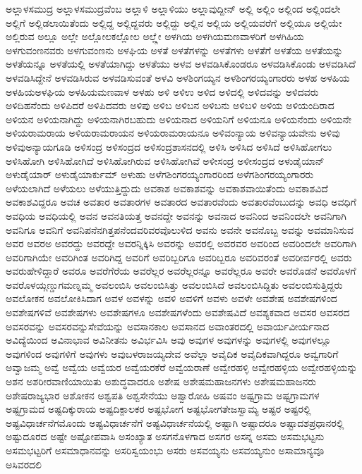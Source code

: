 {ಅಲ್ಲಾಳಸಮುದ್ರ
ಅಲ್ಲಾಳಸಮುದ್ರವೆಂಬ
ಅಲ್ಲಾಳಿ
ಅಲ್ಲಾಳಿಯು
ಅಲ್ಲಾವುದ್ದೀನ್
ಅಲ್ಲಿ
ಅಲ್ಲಿಂ
ಅಲ್ಲಿಂದ
ಅಲ್ಲಿಂದಲೇ
ಅಲ್ಲಿಗೆ
ಅಲ್ಲಿಡಲಾಯಿತೆಂದು
ಅಲ್ಲಿದ್ದ
ಅಲ್ಲಿದ್ದವರು
ಅಲ್ಲಿದ್ದು
ಅಲ್ಲಿನ
ಅಲ್ಲಿಯ
ಅಲ್ಲಿಯವರೆಗೆ
ಅಲ್ಲಿಯೂ
ಅಲ್ಲಿಯೇ
ಅಲ್ಲಿರುವ
ಅಲ್ಲೂ
ಅಲ್ಲೇ
ಅಲ್ಲೋಲಕಲ್ಲೋಲ
ಅಲ್ಲ್ಲೇ
ಅಳಗಿಯ
ಅಳಗಿಯಮಣವಾಳರಿಗೆ
ಅಳಗಿಹಿಯ
ಅಳಗುವಂಣನವರು
ಅಳಗುವಂಣನು
ಅಳಘಿಯ
ಅಳತೆ
ಅಳತೆಗಳನ್ನು
ಅಳತೆಗಳು
ಅಳತೆಗೆ
ಅಳತೆಯ
ಅಳತೆಯನ್ನು
ಅಳತೆಯನ್ನೂ
ಅಳತೆಯಲ್ಲಿ
ಅಳತೆಯಾಗಿದ್ದು
ಅಳತೆಯು
ಅಳವ
ಅಳವಡಿಸಿಕೊಂಡರೂ
ಅಳವಡಿಸಿಕೊಂಡು
ಅಳವಡಿಸಿದೆ
ಅಳವಡಿಸಿದ್ದೇನೆ
ಅಳವಡಿಸಿರುವ
ಅಳವಡಿಸುವಂತೆ
ಅಳವಿ
ಅಳಶಿಂಗಯ್ಯನ
ಅಳಶಿಂಗರಯ್ಯಂಗಾರರು
ಅಳಹ
ಅಳಹಿಯ
ಅಳಹಿಯಅಳಘಿಯ
ಅಳಹಿಯಮಣವಾಳ
ಅಳಹು
ಅಳಿ
ಅಳಿಉ
ಅಳಿದ
ಅಳಿದಲ್ಲಿ
ಅಳಿದವನ್ನು
ಅಳಿದವರು
ಅಳಿದಿಹನೆಂದು
ಅಳಿಪಿದರೆ
ಅಳಿಪಿದವರು
ಅಳಿಪು
ಅಳಿಬ
ಅಳಿಬನ
ಅಳಿಬನು
ಅಳಿಬಳಿ
ಅಳಿಯ
ಅಳಿಯಂದಿರಾದ
ಅಳಿಯನ
ಅಳಿಯನಾಗಿದ್ದು
ಅಳಿಯನಾಗಿರಬಹುದು
ಅಳಿಯನಾದ
ಅಳಿಯನಿಗೆ
ಅಳಿಯನೂ
ಅಳಿಯನೆಂದು
ಅಳಿಯನೇ
ಅಳಿಯರಾಮರಾಯ
ಅಳಿಯರಾಮರಾಯನ
ಅಳಿಯರಾಮರಾಯನೂ
ಅಳಿವಂನ್ಯಾಯ
ಅಳಿವನ್ಯಾಯವೇನು
ಅಳಿವು
ಅಳಿವುಅನ್ಯಾಯಗೂಡಿ
ಅಳಿಸಂದ್ರ
ಅಳಿಸಂದ್ರದ
ಅಳಿಸಂದ್ರಶಾಸನದಲ್ಲಿ
ಅಳಿಸಿ
ಅಳಿಸಿದ
ಅಳಿಸಿದೆ
ಅಳಿಸಿಹೋಗಲು
ಅಳಿಸಿಹೋಗಿ
ಅಳಿಸಿಹೋಗಿದೆ
ಅಳಿಸಿಹೋಗಿರುವ
ಅಳಿಸಿಹೋಗಿವೆ
ಅಳೀಸಂದ್ರ
ಅಳೀಸಂದ್ರದ
ಅಳುಡೈಯಾನ್
ಅಳುಡೈಯಾರ್
ಅಳುಡೈಯಾರ್ಕುಮ್
ಅಳುಹು
ಅಳೆಗಶಿಂಗರಯ್ಯಂಗಾರರಿಂದ
ಅಳೆಗಶಿಂಗರಯ್ಯಂಗಾರರು
ಅಳೆಯಲಾಗಿದೆ
ಅಳೆಯಲು
ಅಳೆಯುತ್ತಿದ್ದುದು
ಅವಕಾಶ
ಅವಕಾಶವನ್ನು
ಅವಕಾಶವಾಯಿತೆಂದು
ಅವಕಾಶವಿದೆ
ಅವಕಾಶವಿದ್ದರೂ
ಅವಚ
ಅವತಾರ
ಅವತಾರಗಳ
ಅವತಾರದ
ಅವತಾರವೆಂದು
ಅವತಾರವೆಂಬುದನ್ನು
ಅವಧಿ
ಅವಧಿಗೆ
ಅವಧಿಯ
ಅವಧಿಯಲ್ಲಿ
ಅವನ
ಅವನತಿಯತ್ತ
ಅವನದ್ದೇ
ಅವನನ್ನು
ಅವನಾದ
ಅವನಿಂದ
ಅವನಿಂದಲೇ
ಅವನಿಗಾಗಿ
ಅವನಿಗೂ
ಅವನಿಗೆ
ಅವನಿಪನೆನಗಿತ್ತಪನೆಂದವರಿವರವೊಲುಳಿದ
ಅವನು
ಅವನೇ
ಅವನೊಬ್ಬ
ಅವನ್ನು
ಅವಮಾನಿಸುವ
ಅವರ
ಅವರಅ
ಅವರದ್ದು
ಅವರದ್ದೇ
ಅವರನ್ನಿಕ್ಕಿಸಿ
ಅವರನ್ನು
ಅವರಲ್ಲಿ
ಅವರವರ
ಅವರಿಂದ
ಅವರಿಂದಲೇ
ಅವರಿಗಾಗಿ
ಅವರಿಗಾಗಿಯೇ
ಅವರಿಗಿಂತ
ಅವರಿಗಿದ್ದ
ಅವರಿಗೆ
ಅವರಿಬ್ಬರಿಗೂ
ಅವರಿಬ್ಬರೂ
ಅವರಿವರಂತೆ
ಅವರೀರ್ವರಲ್ಲಿ
ಅವರು
ಅವರುಹೇಳಿದ್ದಾರೆ
ಅವರೂ
ಅವರೆಗೆರೆಯ
ಅವರೆಲ್ಲರ
ಅವರೆಲ್ಲರನ್ನೂ
ಅವರೆಲ್ಲರೂ
ಅವರೇ
ಅವರೊಡನೆ
ಅವರೊಳಗೆ
ಅವರೊಳಯ್ಗಣ್ಡುಗಮಣ್ನಮ್ಮ
ಅವಲಂಬಿಸಿ
ಅವಲಂಬಿಸಿತ್ತು
ಅವಲಂಬಿಸಿದೆ
ಅವಲಂಬಿಸಿದ್ದಿತು
ಅವಲಂಬಿಸುತ್ತಿದ್ದರು
ಅವಲೋಕನ
ಅವಲೋಕಿಸಿದಾಗ
ಅವಳ
ಅವಳನ್ನು
ಅವಳಿ
ಅವಳಿಗೆ
ಅವಳು
ಅವಳೇ
ಅವಶೇಷ
ಅವಶೇಷಗಳಿಂದ
ಅವಶೇಷಗಳಿವೆ
ಅವಶೇಷಗಳು
ಅವಶೇಷಗಳೂ
ಅವಶೇಷಗಳೆಂದು
ಅವಶೇಷವಿದೆ
ಅವಶ್ಯಕವಾದ
ಅವಸರ
ಅವಸರದ
ಅವಸರವನ್ನು
ಅವಸರವನ್ನುಸೇವೆಯನ್ನು
ಅವಸಾನಕಾಲ
ಅವಸಾನದ
ಅವಾಂತರದಲ್ಲಿ
ಅವಾರ್ಯವೀರ್ಯನಾದ
ಅವಿದ್ಯೆಯಿಂದ
ಅವಿನಾಭಾವ
ಅವಿನೀತನು
ಅವಿರ್ಭವಿಸಿ
ಅವು
ಅವುಗಳ
ಅವುಗಳನ್ನು
ಅವುಗಳಲ್ಲಿ
ಅವುಗಳಲ್ಲೂ
ಅವುಗಳಿಂದ
ಅವುಗಳಿಗೆ
ಅವುಗಳು
ಅವುಬಳರಾಜಯ್ಯದೇವ
ಅವೆಲ್ಲಾ
ಅವೈದಿಕ
ಅವೈದಿಕವಾಗಿದ್ದರೂ
ಅವ್ವಗಾರಿಗೆ
ಅವ್ವಾಜಮ್ಮ
ಅವ್ವೆ
ಅವ್ವೆಯ
ಅವ್ವೆಯರ
ಅವ್ವೆಯರಕೆರೆ
ಅವ್ವೆಯರಾಣೆ
ಅವ್ವೇರಹಳ್ಳಿ
ಅವ್ವೇರಹಳ್ಳಿಯ
ಅವ್ವೇರಹಳ್ಳಿಯನ್ನು
ಅಶನ
ಅಶರೀರವಾಣಿಯಾಯಿತು
ಅಶುದ್ಧವಾದರೂ
ಅಶೇಷ
ಅಶೇಷಮಹಾಜನಗಳು
ಅಶೇಷಮಹಾಜನರು
ಅಶೇಷರಾಜ್ಯಭಾರ
ಅಶೋಕನ
ಅಶ್ವಪತಿ
ಅಶ್ವಸೇನೆಯು
ಅಶ್ವಾರೋಹಿ
ಅಷವಂ
ಅಷ್ಟಗ್ರಾಮ
ಅಷ್ಟಗ್ರಾಮಗಳ
ಅಷ್ಟಗ್ರಾಮದ
ಅಷ್ಟದಿಕ್ಕುರಾಯ
ಅಷ್ಟದಿಕ್ಪಾಲಕರ
ಅಷ್ಟಭೋಗ
ಅಷ್ಟಭೋಗತೇಜಸ್ವಾಮ್ಯ
ಅಷ್ಟರ
ಅಷ್ಟರಲ್ಲಿ
ಅಷ್ಟವಿಧಾರ್ಚನೆಗಮೊಂದು
ಅಷ್ಟವಿಧಾರ್ಚನೆಗೆ
ಅಷ್ಟವಿಧಾರ್ಚನೆಯಲ್ಲಿ
ಅಷ್ಟಾಗಿ
ಅಷ್ಟಾದರೂ
ಅಷ್ಟಾದಶಪ್ರಧಾನರಲ್ಲಿ
ಅಷ್ಟುದೂರದ
ಅಷ್ಟೇ
ಅಷ್ಟೋಪವಾಸಿ
ಅಸಂಖ್ಯಾತ
ಅಸಗನೊಳಗಾದ
ಅಸಗರ
ಅಸನ್ನ
ಅಸಮ
ಅಸಮಭಟ್ಟನು
ಅಸಮಭಟ್ಟರಿಗೆ
ಅಸಮಾಧಾನವನ್ನು
ಅಸರಿಸ್ವಯಂಭು
ಅಸರು
ಅಸವಯ್ಯನು
ಅಸವಯ್ಯನುಂ
ಅಸಾಮಾನ್ಯವೂ
ಅಸಿವರದಲಿ
}

